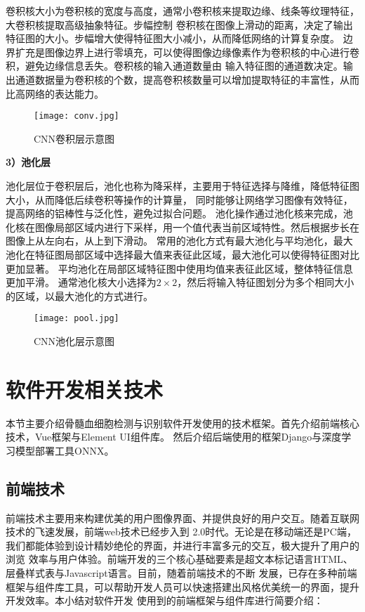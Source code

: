 卷积核大小为卷积核的宽度与高度，通常小卷积核来提取边缘、线条等纹理特征，大卷积核提取高级抽象特征。步幅控制
卷积核在图像上滑动的距离，决定了输出特征图的大小。步幅增大使得特征图大小减小，从而降低网络的计算复杂度。
边界扩充是图像边界上进行零填充，可以使得图像边缘像素作为卷积核的中心进行卷积，避免边缘信息丢失。卷积核的输入通道数量由
输入特征图的通道数决定。输出通道数据量为卷积核的个数，提高卷积核数量可以增加提取特征的丰富性，从而比高网络的表达能力。

\begin{figure}[htbp]
  \centering
  \texttt{[image: conv.jpg]}
  \caption{CNN卷积层示意图}
  \label{fig:conv}
\end{figure}

\textbf{3）池化层}

池化层位于卷积层后，池化也称为降采样，主要用于特征选择与降维，降低特征图大小，从而降低后续卷积等操作的计算量，
同时能够让网络学习图像有效特征，提高网络的铝棒性与泛化性，避免过拟合问题。
池化操作通过池化核来完成，池化核在图像局部区域内进行下采样，用一个值代表当前区域特性。然后根据步长在图像上从左向右，从上到下滑动。
常用的池化方式有最大池化与平均池化，最大池化在特征图局部区域中选择最大值来表征此区域，最大池化可以使得特征图对比更加显著。
平均池化在局部区域特征图中使用均值来表征此区域，整体特征信息更加平滑。
通常池化核大小选择为$2 \times 2$，然后将输入特征图划分为多个相同大小的区域，以最大池化的方式进行。

\begin{figure}[htbp]
  \centering
  \texttt{[image: pool.jpg]}
  \caption{CNN池化层示意图}
  \label{fig:pool}
\end{figure}


\section{软件开发相关技术}
本节主要介绍骨髓血细胞检测与识别软件开发使用的技术框架。首先介绍前端核心技术，Vue框架与Element UI组件库。
然后介绍后端使用的框架Django与深度学习模型部署工具ONNX。

\subsection{前端技术}

前端技术主要用来构建优美的用户图像界面、并提供良好的用户交互。随着互联网技术的飞速发展，前端web技术已经步入到
2.0时代。无论是在移动端还是PC端，我们都能体验到设计精妙绝伦的界面，并进行丰富多元的交互，极大提升了用户的浏览
效率与用户体验。前端开发的三个核心基础要素是超文本标记语言HTML、层叠样式表与Javascript语言。目前，随着前端技术的不断
发展，已存在多种前端框架与组件库工具，可以帮助开发人员可以快速搭建出风格优美统一的界面，提升开发效率。本小结对软件开发
使用到的前端框架与组件库进行简要介绍：

